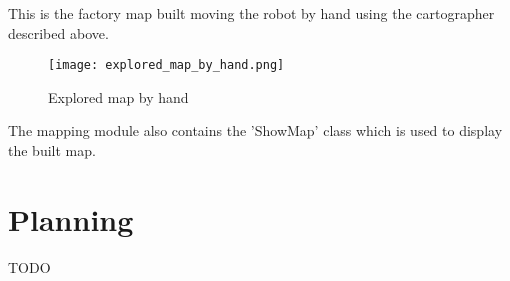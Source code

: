 This is the factory map built moving the robot by hand using the cartographer described above.

\FloatBarrier
\begin{figure}
    \centering\texttt{[image: explored\_map\_by\_hand.png]}
    \label{fig:explored_map_by_hand}
    \caption{Explored map by hand}
\end{figure}
\FloatBarrier

The mapping module also contains the 'ShowMap' class which is used to display the built map.

\section{Planning}

TODO

